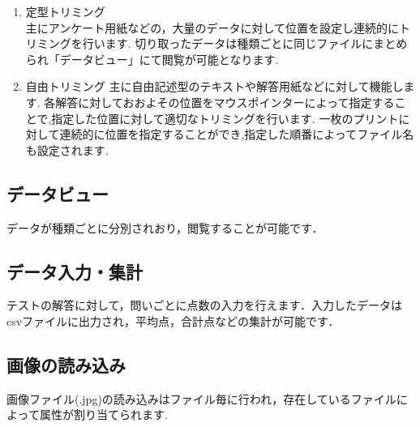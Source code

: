 \documentclass[12pt]{jsreport}
\begin{document}
\begin{enumerate}
    \item 定型トリミング \\
    主にアンケート用紙などの，大量のデータに対して位置を設定し連続的にトリミングを行います.
    切り取ったデータは種類ごとに同じファイルにまとめられ「データビュー」にて閲覧が可能となります.
    \item 自由トリミング
    主に自由記述型のテキストや解答用紙などに対して機能します.
    各解答に対しておおよその位置をマウスポインターによって指定することで,指定した位置に対して適切なトリミングを行います.
    一枚のプリントに対して連続的に位置を指定することができ,指定した順番によってファイル名も設定されます.

\end{enumerate}

\subsection{データビュー}
データが種類ごとに分別されおり，閲覧することが可能です．
\subsection{データ入力・集計}
テストの解答に対して，問いごとに点数の入力を行えます．入力したデータはcsvファイルに出力され，平均点，合計点などの集計が可能です．
\subsection{画像の読み込み}
画像ファイル(.jpg)の読み込みはファイル毎に行われ，存在しているファイルによって属性が割り当てられます.

\newpage
\end{document}

